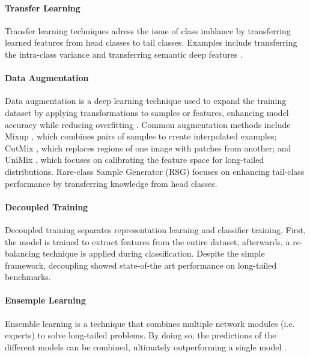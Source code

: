 \paragraph{Transfer Learning}
Transfer learning techniques adress the issue of class imblance by transferring learned features from head classes to tail classes. Examples include transferring the intra-class variance \cite{yin2019featuretransferlearningdeep} and transferring semantic deep features \cite{liu2019largescalelongtailedrecognitionopen}.

\paragraph{Data Augmentation}
Data augmentation is a deep learning technique used to expand the training dataset by applying transformations to samples or features, enhancing model accuracy while reducing overfitting \cite{perez2017effectivenessdataaugmentationimage,shorten2019survey}. Common augmentation methods include Mixup \cite{zhang2018mixupempiricalriskminimization}, which combines pairs of samples to create interpolated examples; CutMix \cite{yun2019cutmixregularizationstrategytrain}, which replaces regions of one image with patches from another; and UniMix \cite{xu2021calibratedmodellongtailedvisual}, which focuses on calibrating the feature space for long-tailed distributions. Rare-class Sample Generator (RSG) \cite{wang2021rsgsimpleeffectivemodule} focuses on enhancing tail-class performance by transferring knowledge from head classes.

\paragraph{Decoupled Training}
Decoupled training \cite{kang2020decouplingrepresentationclassifierlongtailed} separates representation learning and classifier training. First, the model is trained to extract features from the entire dataset, afterwards, a re-balancing technique is applied during classification. Despite the simple framework, decoupling showed state-of-the art performance on long-tailed benchmarks.

\paragraph{Ensemple Learning}
Ensemble learning is a technique that combines multiple network modules (i.e. experts) to solve long-tailed problems. By doing so, the predictions of the different models can be combined, ultimately outperforming a single model \cite{zhou2020bbnbilateralbranchnetworkcumulative,wang2022longtailedrecognitionroutingdiverse}.

